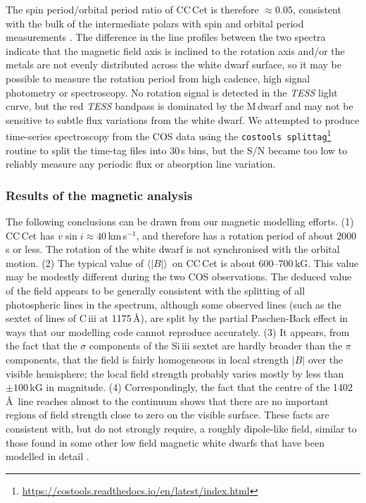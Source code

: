 \documentclass[fleqn,usenatbib]{mnras}
\newcommand{\bs}{\ensuremath{\langle \vert B \vert \rangle}}
\newcommand{\kms}{km\,s$^{-1}$}
\begin{document}
The spin period/orbital period ratio of CC\,Cet is therefore $\approx0.05$, consistent with the bulk of the intermediate polars with spin and orbital period measurements \citep{bernardinietal17-1}. The difference in the line profiles between the two spectra indicate that the magnetic field axis is inclined to the rotation axis and/or the metals are not evenly distributed across the white dwarf surface, so it may be possible to measure the rotation period from high cadence, high signal photometry or spectroscopy. No rotation signal is detected in the \textit{TESS} light curve, but the red \textit{TESS} bandpass is dominated by the M\,dwarf and may not be sensitive to subtle flux variations from the white dwarf. We attempted to produce time-series spectroscopy from the COS data using the \texttt{costools splittag}\footnote{\url{https://costools.readthedocs.io/en/latest/index.html}} routine to split the time-tag files into 30\,s bins, but the S/N became too low to reliably measure any periodic flux or absorption line variation.    

\subsubsection{Results of the magnetic analysis}

The following conclusions can be drawn from our magnetic modelling efforts. (1) CC\,Cet has $v \sin i \approx 40$\,\kms, and therefore has a rotation period of about 2000\,s or less. The rotation of the white dwarf is not synchronised with the orbital motion. (2) The typical value of \bs\ on CC\,Cet is about 600--700\,kG. This value may be modestly different during the two COS observations. The deduced value of the field appears to be generally consistent with the splitting of all photospheric lines in the spectrum, although some observed lines (such as the sextet of lines of C\,{\sc iii} at 1175\,\AA), are split by the partial Paschen-Back effect in ways that our modelling code cannot reproduce accurately. (3) It appears, from the fact that the $\sigma$ components of the Si\,{\sc iii} sextet are hardly broader than the $\pi$ components, that the field is fairly homogeneous in local strength $|B|$ over the visible hemisphere; the local field strength probably varies mostly by less than $\pm 100$\,kG in magnitude. (4) Correspondingly, the fact that the centre of the 1402\,\AA\ line reaches almost to the continuum shows that there are no important regions of field strength close to zero on the visible surface. These facts are consistent with, but do not strongly require, a roughly dipole-like field, similar to those found in some other low field magnetic white dwarfs that have been modelled in detail \citep[e.g. WD\,2047+372: see][]{landstreetetal17-1}.
\end{document}
